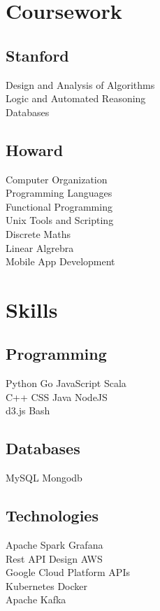 \documentclass[]{deedy-resume-openfont}
\begin{document}
\begin{minipage}[t]{0.33\textwidth}

\section{Coursework}
\subsection{Stanford}
Design and Analysis of Algorithms \\
Logic and Automated Reasoning \\
Databases \\
\sectionsep

\subsection{Howard}
Computer Organization \\
Programming Languages \\
Functional Programming \\
Unix Tools and Scripting \\
Discrete Maths \\
Linear Algrebra \\
Mobile App Development \\
\sectionsep


\section{Skills}
\subsection{Programming}
Python \textbullet{}   Go \textbullet{} JavaScript \textbullet{} Scala \\
 C++ \textbullet{}  CSS \textbullet{} Java
 \textbullet{} NodeJS  \\ d3.js \textbullet{}  Bash \\
\sectionsep
\subsection{Databases}
MySQL \textbullet{} Mongodb
\sectionsep

\subsection{Technologies}
 Apache Spark \textbullet{} Grafana \\ 
  Rest API Design \textbullet{} AWS \textbullet{} \\
  Google Cloud Platform APIs \\
  Kubernetes \textbullet{} 
  Docker \\
  Apache Kafka 
 \sectionsep
 

\end{minipage}
\end{document}
